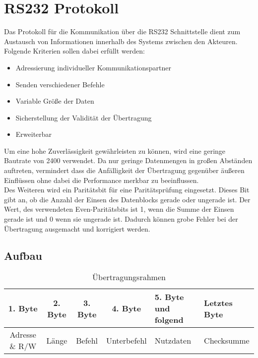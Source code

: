 \section{RS232 Protokoll}
\label{section_RS232_Protokoll}
Das Protokoll für die Kommunikation über die RS232 Schnittstelle dient zum Austausch von Informationen innerhalb des Systems zwischen den Akteuren. \\

Folgende Kriterien sollen dabei erfüllt werden:
\begin{itemize}
\item Adressierung individueller Kommunikationspartner
\item Senden verschiedener Befehle
\item Variable Größe der Daten
\item Sicherstellung der Validität der Übertragung
\item Erweiterbar
\end{itemize}



Um eine hohe Zuverlässigkeit gewährleisten zu können, wird eine geringe Bautrate von 2400 verwendet. Da nur geringe Datenmengen in großen Abständen auftreten, vermindert dass die Anfälligkeit der Übertragung gegenüber äußeren Einflüssen ohne dabei die Performance merkbar zu beeinflussen.\\
Des Weiteren wird ein Paritätsbit für eine Paritätsprüfung eingesetzt. Dieses Bit gibt an, ob die Anzahl der Einsen des Datenblocks gerade oder ungerade ist. Der Wert, des verwendeten Even-Paritätsbits ist 1, wenn die Summe der Einsen gerade ist und 0 wenn sie ungerade ist. Dadurch können grobe Fehler bei der Übertragung ausgemacht und korrigiert werden.\\

\subsection{Aufbau}
\begin{table}[H]
\begin{center}
\begin{tabularx}{\textwidth}{|c|c|c|c|X|X|}\hline
 1. Byte & 2. Byte & 3. Byte & 4. Byte & 5. Byte und folgend & Letztes Byte\\ \hline
  Adresse \& R/W & Länge & Befehl & Unterbefehl & Nutzdaten & Checksumme\\ \hline
\end{tabularx}
\caption{Übertragungsrahmen}
\label{table_Frame}
\end{center}
\end{table}

